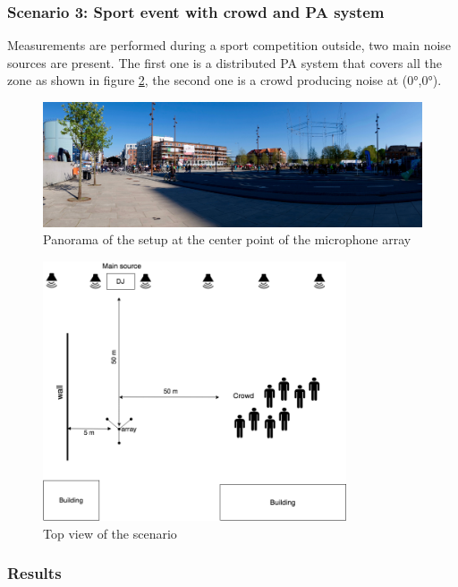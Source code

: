\newpage
\subsubsection{Scenario 3: Sport event with crowd and PA system }

Measurements are performed during a sport competition outside, two main noise sources are present. The first one is a distributed PA system that covers all the zone as shown in figure \ref{fig:Scenario1diagram}, the second one is a crowd producing noise at (0°,0°).

\begin{figure}[H]
    \centering
    \includegraphics[width=1\textwidth]{Figures/bmxracepic.jpg}
    \caption{Panorama of the setup at the center point of the microphone array}
    \label{fig:Scenario2}
\end{figure}

\begin{figure}[H]
    \centering
    \includegraphics[width=0.8\textwidth]{Figures/bmxrace1.png}
    \caption{Top view of the scenario}
    \label{fig:Scenario1diagram}
\end{figure}

\subsubsection{Results}

